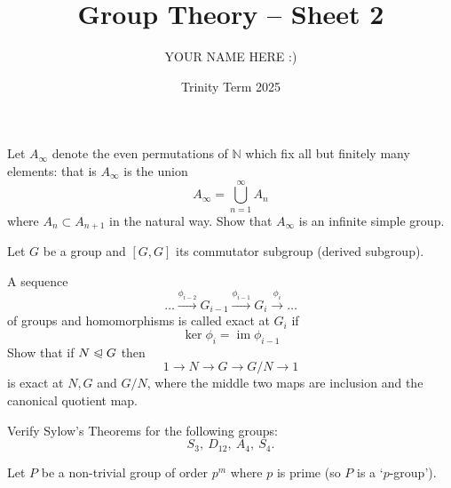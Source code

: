 \documentclass[answers]{exam}
\title{Group Theory -- Sheet 2}
\author{YOUR NAME HERE :)}
\date{Trinity Term 2025}
\let\nsg\trianglelefteqslant%
\begin{document}
\maketitle
\begin{questions}

\question%
Let $A_{\infty}$ denote the even permutations of $\mathbb{N}$ which fix all but finitely many elements: that is $A_{\infty}$ is the union \[
	A_{\infty}=\bigcup_{n=1}^{\infty} A_{n}
\] where $A_{n} \subset A_{n+1}$ in the natural way. Show that $A_{\infty}$ is an infinite simple group.



\question%
Let $G$ be a group and $[G, G]$ its commutator subgroup (derived subgroup).



\question%
A sequence \[
	\ldots \xrightarrow{\phi_{i-2}} G_{i-1} \xrightarrow{\phi_{i-1}} G_{i} \xrightarrow{\phi_{i}} \ldots
\] of groups and homomorphisms is called exact at $G_{i}$ if \[
	\operatorname{ker} \phi_{i}=\operatorname{im} \phi_{i-1}
\] Show that if $N \nsg G$ then \[
	1 \to N \to G \to G / N \to 1
\] is exact at $N, G$ and $G / N$, where the middle two maps are inclusion and the canonical quotient map.



\question%
Verify Sylow's Theorems for the following groups: \[
	S_{3},\ D_{12},\ A_{4},\ S_{4} .
\]



\question%
Let $P$ be a non-trivial group of order $p^{m}$ where $p$ is prime (so $P$ is a `$p$-group').
\end{questions}
\end{document}
